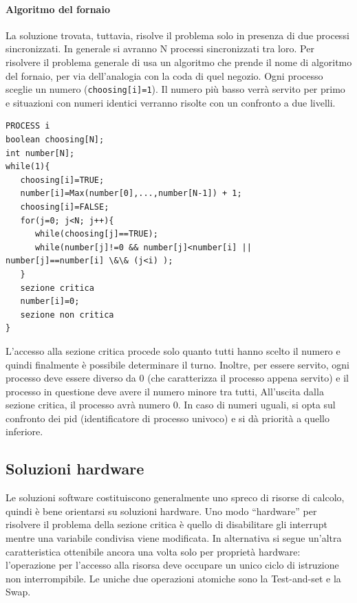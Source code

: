 \documentclass[a4paper]{article}
\begin{document}
\paragraph{Algoritmo del fornaio}
La soluzione trovata, tuttavia, risolve il problema solo in presenza di due processi sincronizzati. In generale si avranno N processi sincronizzati tra loro. Per risolvere il problema generale di usa un algoritmo che prende il nome di algoritmo del fornaio, per via dell'analogia con la coda di quel negozio. Ogni processo sceglie un numero (\texttt{choosing[i]=1}). Il numero più basso verrà servito per primo e situazioni con numeri identici verranno risolte con un confronto a due livelli.

\begin{verbatim}
PROCESS i
boolean choosing[N];
int number[N];
while(1){
   choosing[i]=TRUE;
   number[i]=Max(number[0],...,number[N-1]) + 1;
   choosing[i]=FALSE;
   for(j=0; j<N; j++){
      while(choosing[j]==TRUE);
      while(number[j]!=0 && number[j]<number[i] || number[j]==number[i] \&\& (j<i) );
   }
   sezione critica
   number[i]=0;
   sezione non critica
}
\end{verbatim}
L'accesso alla sezione critica procede solo quanto tutti hanno scelto il numero e quindi finalmente è possibile determinare il turno. Inoltre, per essere servito, ogni processo deve essere diverso da 0 (che caratterizza il processo appena servito) e il processo in questione deve avere il numero minore tra tutti, All'uscita dalla sezione critica, il processo avrà numero 0. In caso di numeri uguali, si opta sul confronto dei pid (identificatore di processo univoco) e si dà priorità a quello inferiore.

\subsection{Soluzioni hardware}
Le soluzioni software costituiscono generalmente uno spreco di risorse di calcolo, quindi è bene orientarsi su soluzioni hardware. Uno modo ``hardware'' per risolvere il problema della sezione critica è quello di disabilitare gli interrupt mentre una variabile condivisa viene modificata. In alternativa si segue un’altra caratteristica ottenibile ancora una volta solo per proprietà hardware: l’operazione per l’accesso alla risorsa deve occupare un unico ciclo di istruzione non interrompibile. Le uniche due operazioni atomiche sono la Test-and-set e la Swap.
\end{document}
